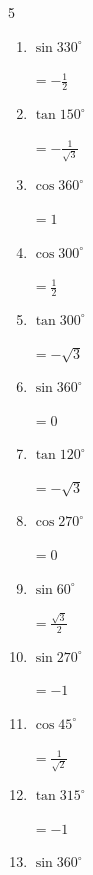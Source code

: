 \begin{multicols}{5}
\begin{enumerate}
        $\displaystyle なし$

  \item $\displaystyle \sin{330^\circ}$

        $\displaystyle =-\frac{1}{2}$

  \item $\displaystyle \tan{150^\circ}$

        $\displaystyle =-\frac{1}{\sqrt{3}}$

  \item $\displaystyle \cos{360^\circ}$

        $\displaystyle =1$

  \item $\displaystyle \cos{300^\circ}$

        $\displaystyle =\frac{1}{2}$

  \item $\displaystyle \tan{300^\circ}$

        $\displaystyle =-\sqrt{3}$

  \item $\displaystyle \sin{360^\circ}$

        $\displaystyle =0$

  \item $\displaystyle \tan{120^\circ}$

        $\displaystyle =-\sqrt{3}$

  \item $\displaystyle \cos{270^\circ}$

        $\displaystyle =0$

  \item $\displaystyle \sin{60^\circ}$

        $\displaystyle =\frac{\sqrt{3}}{2}$

  \item $\displaystyle \sin{270^\circ}$

        $\displaystyle =-1$

  \item $\displaystyle \cos{45^\circ}$

        $\displaystyle =\frac{1}{\sqrt{2}}$

\columnbreak %

  \item $\displaystyle \tan{315^\circ}$

        $\displaystyle =-1$

  \item $\displaystyle \sin{360^\circ}$


\end{enumerate}
\end{multicols}
